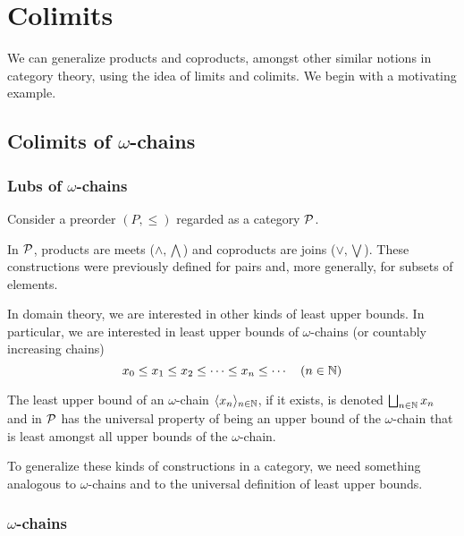 \newcommand*{\threesim}{%
\mathrel{\vcenter{\offinterlineskip
\hbox{$\sim$}\vskip-.45ex\hbox{$\sim$}\vskip-.45ex\hbox{$\sim$}}}}

\chapter{Colimits}

We can generalize products and coproducts, amongst other similar notions in
category theory, using the idea of limits and colimits.  We begin with a
motivating example.

\section{Colimits of $\omega$-chains}

\subsection{Lubs of $\omega$-chains}

Consider a preorder $(P, \leq)$ regarded as a category  $\mathcal{P}$.

In $\mathcal{P}$,  products are meets ($\wedge, \bigwedge$) and coproducts are
joins ($\vee,\bigvee$). These constructions were previously defined for pairs
and, more generally, for subsets of elements.

In domain theory, we are interested in other kinds of least upper bounds. In
particular, we are interested in least upper bounds of $\omega$-chains (or
countably increasing chains)
\[
    x_0 \leq x_1 \leq x_2 \leq \cdots \leq x_n \leq \cdots \quad (n \in \mathbb{N})
\]

The least upper bound of an $\omega$-chain $\langle  x_n  \rangle_{n\in\mathbb{N}}$, if it
exists, is denoted $\bigsqcup_{n \in \mathbb{N}}x_n$ and in $\mathcal{P}$ has the
universal property of being an upper bound of the $\omega$-chain that is least
amongst all upper bounds of the $\omega$-chain.

To generalize these kinds of constructions in a category, we need something
analogous to $\omega$-chains and to the universal definition of least upper
bounds.

\subsection{$\omega$-chains}

